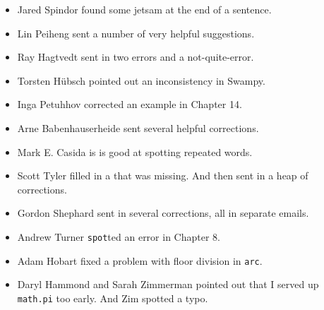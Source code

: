 \documentclass[10pt]{book}
\begin{document}
\begin{itemize}

\item Jared Spindor found some jetsam at the end of a sentence.


\item Lin Peiheng sent a number of very helpful suggestions.


\item Ray Hagtvedt sent in two errors and a not-quite-error.


\item Torsten H\"{u}bsch pointed out an inconsistency in Swampy.


\item Inga Petuhhov corrected an example in Chapter 14.


\item Arne Babenhauserheide sent several helpful corrections.


\item Mark E. Casida is is good at spotting repeated words.


\item Scott Tyler filled in a that was missing.  And then sent in
a heap of corrections.


\item Gordon Shephard sent in several corrections, all in separate
emails.


\item Andrew Turner {\tt spot}ted an error in Chapter 8.


\item Adam Hobart fixed a problem with floor division in {\tt arc}.


\item Daryl Hammond and Sarah Zimmerman pointed out that I served
up {\tt math.pi} too early.  And Zim spotted a typo.



\end{itemize}
\end{document}
